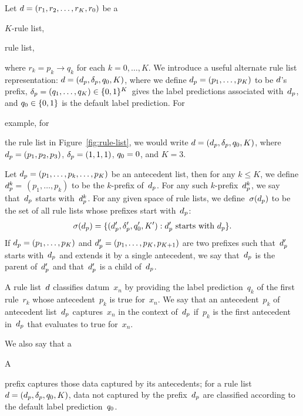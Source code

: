 Let ${{d} = (r_1, r_2, \dots, r_K, r_0)}$ be a
\begin{arxiv}
$K$-rule list,
\end{arxiv}
\begin{kdd}
rule list,
\end{kdd}
where ${r_k = p_k \rightarrow q_k}$ for each ${k = 0, \dots, K}$.
%
We introduce a useful alternate rule list representation:
${{d} = (d_p, \delta_p, q_0, K)}$,
where we define ${d_p = (p_1, \dots, p_K)}$ to be ${d}$'s prefix,
${\delta_p = (q_1, \dots, q_K) \in \{0, 1\}^K}$~gives
the label predictions associated with~$d_p$,
and ${q_0 \in \{0, 1\}}$ is the default label prediction.
%
For
\begin{arxiv}
example, for
\end{arxiv}
the rule list in Figure~\ref{fig:rule-list},
we would write ${{d} = (d_p, \delta_p, q_0, K)}$,
where ${d_p = (p_1, p_2, p_3)}$, ${\delta_p = (1, 1, 1)}$,
${q_0 = 0}$, and ${K=3}$.

Let ${d_p = (p_1, \dots, p_k, \dots, p_K)}$ be an antecedent list,
then for any ${k \le K}$, we define ${d_p^k =}$ ${(p_1, \dots, p_k)}$
to be the $k$-prefix of~$d_p$.
%
For any such $k$-prefix~$d_p^k$,
we say that~$d_p$ starts with~$d_p^k$.
%
For any given space of rule lists,
we define~$\sigma(d_p)$ to be the set of
all rule lists whose prefixes start with~$d_p$:
\begin{align}
\sigma(d_p) =
\{(d_p', \delta_p', q_0', K') : d_p' \textnormal{ starts with } d_p \}.
\label{eq:starts-with}
\end{align}
%
If ${d_p = (p_1, \dots, p_K)}$ and ${d_p' = (p_1, \dots, p_K, p_{K+1})}$
are two prefixes such that~$d_p'$ starts with~$d_p$ and extends it by
a single antecedent, we say that~$d_p$ is the parent of~$d_p'$
and that~$d_p'$ is a child of~$d_p$.

A rule list~${d}$ classifies datum~$x_n$ by providing the label prediction~$q_k$
of the first rule~$r_k$ whose antecedent~$p_k$ is true for~$x_n$.
%
We say that an antecedent~$p_k$ of antecedent list~$d_p$ captures~$x_n$
in the context of~$d_p$ if~$p_k$ is the first antecedent in~$d_p$ that
evaluates to true for~$x_n$.
%
\begin{arxiv}
We also say that a
\end{arxiv}
\begin{kdd}
A
\end{kdd}
prefix captures those data captured by its antecedents;
for a rule list~${{d} = (d_p, \delta_p, q_0, K)}$,
data not captured by the prefix~$d_p$
are classified according to the default label prediction~$q_0$.

